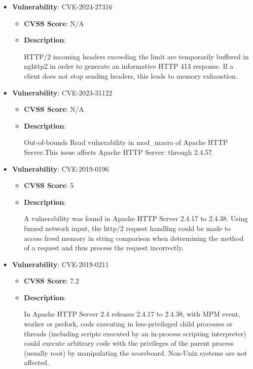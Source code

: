 \documentclass{article}
\begin{document}
\begin{itemize}
        \item \textbf{Vulnerability}: CVE-2024-27316
        \begin{itemize}
            \item \textbf{CVSS Score}:  N/A 
            \item \textbf{Description}:
            \parbox[t]{0.9\linewidth}{
                \ttfamily HTTP/2 incoming headers exceeding the limit are temporarily buffered in nghttp2 in order to generate an informative HTTP 413 response. If a client does not stop sending headers, this leads to memory exhaustion.
            }
        \end{itemize}
    
        \item \textbf{Vulnerability}: CVE-2023-31122
        \begin{itemize}
            \item \textbf{CVSS Score}:  N/A 
            \item \textbf{Description}:
            \parbox[t]{0.9\linewidth}{
                \ttfamily Out-of-bounds Read vulnerability in mod\_macro of Apache HTTP Server.This issue affects Apache HTTP Server: through 2.4.57.
            }
        \end{itemize}
    
        \item \textbf{Vulnerability}: CVE-2019-0196
        \begin{itemize}
            \item \textbf{CVSS Score}:  5 
            \item \textbf{Description}:
            \parbox[t]{0.9\linewidth}{
                \ttfamily A vulnerability was found in Apache HTTP Server 2.4.17 to 2.4.38. Using fuzzed network input, the http/2 request handling could be made to access freed memory in string comparison when determining the method of a request and thus process the request incorrectly.
            }
        \end{itemize}
    
        \item \textbf{Vulnerability}: CVE-2019-0211
        \begin{itemize}
            \item \textbf{CVSS Score}:  7.2 
            \item \textbf{Description}:
            \parbox[t]{0.9\linewidth}{
                \ttfamily In Apache HTTP Server 2.4 releases 2.4.17 to 2.4.38, with MPM event, worker or prefork, code executing in less-privileged child processes or threads (including scripts executed by an in-process scripting interpreter) could execute arbitrary code with the privileges of the parent process (usually root) by manipulating the scoreboard. Non-Unix systems are not affected.
            }
        \end{itemize}
    

\end{itemize}
\end{document}
